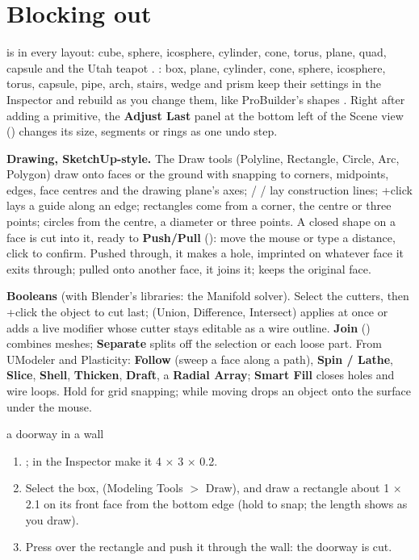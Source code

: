 \section{Blocking out}
 is in every layout: cube, sphere, icosphere, cylinder, cone, torus, plane, quad, capsule
and the Utah teapot \cite{Newell1975Utilization}. : box, plane, cylinder, cone,
sphere, icosphere, torus, capsule, pipe, arch, stairs, wedge and prism keep their settings in the Inspector and rebuild
as you change them, like ProBuilder's shapes \cite{ProBuilderDocs2026}. Right after adding a primitive, the
\textbf{Adjust Last} panel at the bottom left of the Scene view () changes its size, segments or rings as one
undo step.

\textbf{Drawing, SketchUp-style.} The Draw tools (Polyline, Rectangle, Circle, Arc, Polygon) draw onto faces or the
ground with snapping to corners, midpoints, edges, face centres and the drawing plane's axes;  /  / 
lay construction lines; +click lays a guide along an edge; rectangles come from a corner, the centre or three
points; circles from the centre, a diameter or three points. A closed shape on a face is cut into it, ready to
\textbf{Push/Pull} (): move the mouse or type a distance, click to confirm. Pushed through, it makes a hole,
imprinted on whatever face it exits through; pulled onto another face, it joins it;  keeps the original face.
\cite{SketchUpHelp2026, UModelerDocs2026, PlasticityDocs2026}

\textbf{Booleans} (with Blender's libraries: the Manifold solver). Select the cutters, then +click the object
to cut last;  (Union, Difference, Intersect) applies at once or adds a live modifier whose cutter
stays editable as a wire outline. \textbf{Join} () combines meshes; \textbf{Separate} splits off the
selection or each loose part. From UModeler and Plasticity: \textbf{Follow} (sweep a face along a path), \textbf{Spin /
Lathe}, \textbf{Slice}, \textbf{Shell}, \textbf{Thicken}, \textbf{Draft}, a \textbf{Radial Array}; \textbf{Smart Fill}
closes holes and wire loops. Hold  for grid snapping;  while moving drops an object onto the
surface under the mouse.

\begin{example}{a doorway in a wall}
\begin{enumerate}
  \item {}; in the Inspector make it 4 $\times$ 3 $\times$ 0.2.
  \item Select the box,  (Modeling Tools $>$ Draw), and draw a rectangle about 1 $\times$ 2.1 on its front
    face from the bottom edge (hold  to snap; the length shows as you draw).
  \item Press  over the rectangle and push it through the wall: the doorway is cut.
\end{enumerate}
\end{example}

